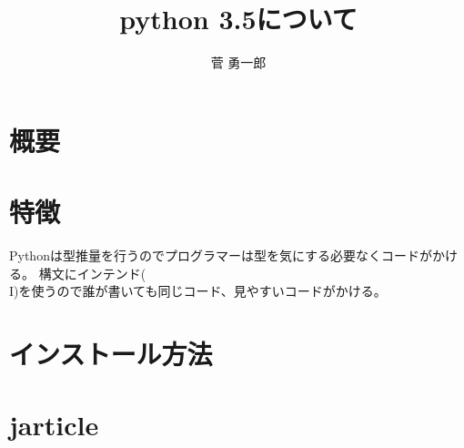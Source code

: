 \documentclass[9pt]{jsarticle}
\title{python 3.5について}
\author{菅 勇一郎}
\begin{document}
\maketitle
\section{概要}
\section{特徴}
Pythonは型推量を行うのでプログラマーは型を気にする必要なくコードがかける。
構文にインテンド(\\I)を使うので誰が書いても同じコード、見やすいコードがかける。
\section{インストール方法}
\section{jarticle}
\end{document}
